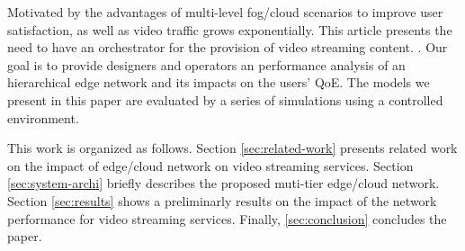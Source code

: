 Motivated by the advantages of multi-level fog/cloud scenarios to improve user satisfaction, as well as video traffic grows exponentially. This article presents the need to have an orchestrator for the provision of video streaming content.
. Our goal is to provide designers and operators an performance analysis  of an hierarchical edge network and its impacts on the users' QoE. The models we present in this paper are evaluated by a series of simulations using a controlled environment.

This work is organized as follows.
Section \ref{sec:related-work} presents related work on the impact of edge/cloud network on video streaming services.
Section \ref{sec:system-archi} briefly describes the proposed muti-tier edge/cloud network.
Section \ref{sec:results} shows a preliminarly results on the impact of the network performance for video streaming services.
Finally, \ref{sec:conclusion} concludes the paper.
